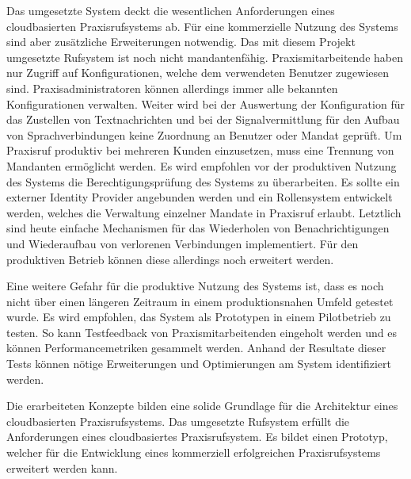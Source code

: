 Das umgesetzte System deckt die wesentlichen Anforderungen eines cloudbasierten Praxisrufsystems ab.
Für eine kommerzielle Nutzung des Systems sind aber zusätzliche Erweiterungen notwendig.
Das mit diesem Projekt umgesetzte Rufsystem ist noch nicht mandantenfähig.
Praxismitarbeitende haben nur Zugriff auf Konfigurationen, welche dem verwendeten Benutzer zugewiesen sind.
Praxisadministratoren können allerdings immer alle bekannten Konfigurationen verwalten.
Weiter wird bei der Auswertung der Konfiguration für das Zustellen von Textnachrichten und bei der Signalvermittlung für den Aufbau von Sprachverbindungen keine Zuordnung an Benutzer oder Mandat geprüft.
Um Praxisruf produktiv bei mehreren Kunden einzusetzen, muss eine Trennung von Mandanten ermöglicht werden.
Es wird empfohlen vor der produktiven Nutzung des Systems die Berechtigungsprüfung des Systems zu überarbeiten.
Es sollte ein externer Identity Provider angebunden werden und ein Rollensystem entwickelt werden, welches die Verwaltung einzelner Mandate in Praxisruf erlaubt.
Letztlich sind heute einfache Mechanismen für das Wiederholen von Benachrichtigungen und Wiederaufbau von verlorenen Verbindungen implementiert.
Für den produktiven Betrieb können diese allerdings noch erweitert werden.

Eine weitere Gefahr für die produktive Nutzung des Systems ist, dass es noch nicht über einen längeren Zeitraum in einem produktionsnahen Umfeld getestet wurde.
Es wird empfohlen, das System als Prototypen in einem Pilotbetrieb zu testen.
So kann Testfeedback von Praxismitarbeitenden eingeholt werden und es können Performancemetriken gesammelt werden.
Anhand der Resultate dieser Tests können nötige Erweiterungen und Optimierungen am System identifiziert werden.

Die erarbeiteten Konzepte bilden eine solide Grundlage für die Architektur eines cloudbasierten Praxisrufsystems.
Das umgesetzte Rufsystem erfüllt die Anforderungen eines cloudbasiertes Praxisrufsystem.
Es bildet einen Prototyp, welcher für die Entwicklung eines kommerziell erfolgreichen Praxisrufsystems erweitert werden kann.

\clearpage
